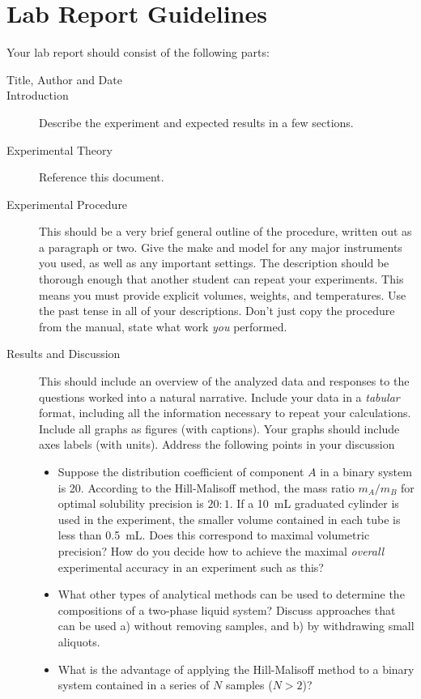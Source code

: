 \section{Lab Report Guidelines} %
\label{sec:lab_report_guidelines}

Your lab report should consist of the following parts:
\begin{description}
	\item[Title, Author and Date]
	\item[Introduction] Describe the experiment and expected results in a few sections. 
	\item[Experimental Theory] Reference this document.
	\item[Experimental Procedure] This should be a very brief general outline of the procedure, written out as a paragraph or two. Give the make and model for any major instruments you used, as well as any important settings. The description should be thorough enough that another student can repeat your experiments. This means you must provide explicit volumes, weights, and temperatures. Use the past tense in all of your descriptions. Don't just copy the procedure from the manual, state what work \emph{you} performed. 
	\item[Results and Discussion] This should include an overview of the analyzed data and responses to the questions worked into a natural narrative. 
	Include your data in a \emph{tabular} format, including all the information necessary to repeat your calculations. 
	Include all graphs as figures (with captions). 
	Your graphs should include axes labels (with units). 
	Address the following points in your discussion
	\begin{itemize}
		\item Suppose the distribution coefficient of component \(A\) in a binary system is \num{20}. 
		According to the Hill-Malisoff method, the mass ratio \(m_A/m_B\) for optimal solubility precision is \(20{:}1\). 
		If a \qty{10}{\mL} graduated cylinder is used in the experiment, the smaller volume contained in each tube is less than \qty{0.5}{\mL}. 
		Does this correspond to maximal volumetric precision? 
		How do you decide how to achieve the maximal \emph{overall} experimental accuracy in an experiment such as this?
		\item What other types of analytical methods can be used to determine the compositions of a two-phase liquid system? Discuss approaches that can be used a) without removing samples, and b) by withdrawing small aliquots. 
		\item What is the advantage of applying the Hill-Malisoff method to a binary system contained in a series of \(N\) samples (\(N>2\))?

\end{itemize}
\end{description}
